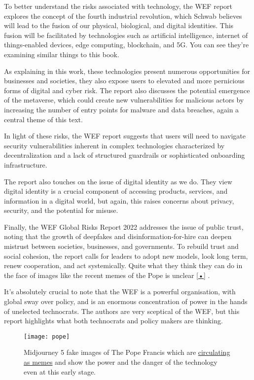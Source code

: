 To better understand the risks associated with technology, the WEF report explores the concept of the fourth industrial revolution, which Schwab believes will lead to the fusion of our physical, biological, and digital identities. This fusion will be facilitated by technologies such as artificial intelligence, internet of things-enabled devices, edge computing, blockchain, and 5G. You can see they're examining similar things to this book.\par
As explaining in this work, these technologies present numerous opportunities for businesses and societies, they also expose users to elevated and more pernicious forms of digital and cyber risk. The report also discusses the potential emergence of the metaverse, which could create new vulnerabilities for malicious actors by increasing the number of entry points for malware and data breaches, again a central theme of this text.\par
In light of these risks, the WEF report suggests that users will need to navigate security vulnerabilities inherent in complex technologies characterized by decentralization and a lack of structured guardrails or sophisticated onboarding infrastructure.\par
The report also touches on the issue of digital identity as we do. They view digital identity is a crucial component of accessing products, services, and information in a digital world, but again, this raises concerns about privacy, security, and the potential for misuse.\par
Finally, the WEF Global Risks Report 2022 addresses the issue of public trust, noting that the growth of deepfakes and disinformation-for-hire can deepen mistrust between societies, businesses, and governments. To rebuild trust and social cohesion, the report calls for leaders to adopt new models, look long term, renew cooperation, and act systemically. Quite what they think they can do in the face of images like the recent memes of the Pope is unclear \ref{•} .\par 
It's absolutely crucial to note that the WEF is a powerful organisation, with global sway over policy, and is an enormous concentration of power in the hands of unelected technocrats. The authors are very sceptical of the WEF, but this report highlights what both technocrats and policy makers are thinking.

\begin{figure}
  \centering
    \texttt{[image: pope]}
  \caption{Midjourney 5 fake images of The Pope Francis which are \href{https://www.reddit.com/r/midjourney/comments/120vhdc/the_pope_drip/}{circulating as memes} and show the power and the danger of the technology even at this early stage.}
  \label{fig:time}
\end{figure}
